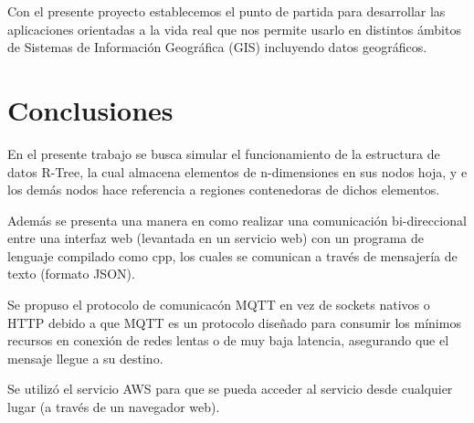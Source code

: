 \documentclass[a4paper]{article}
\begin{document}
Con el presente proyecto establecemos el punto de partida  para desarrollar las aplicaciones orientadas a la vida real que nos permite usarlo en distintos ámbitos de Sistemas de Información Geográfica (GIS) incluyendo datos geográficos.

\section{Conclusiones}

En el presente trabajo se busca simular el funcionamiento de la estructura de datos R-Tree, la cual almacena elementos de n-dimensiones en sus nodos hoja, y e los demás nodos hace referencia a regiones contenedoras de dichos elementos. 

Además se presenta una manera en como realizar una comunicación bi-direccional entre una interfaz web (levantada en un servicio web) con un programa de lenguaje compilado como cpp, los cuales se comunican a través de mensajería de texto (formato JSON).

Se propuso el protocolo de comunicacón MQTT en vez de sockets nativos o HTTP debido a que MQTT es un protocolo diseñado para consumir los mínimos recursos en conexión de redes lentas o de muy baja latencia, asegurando que el mensaje llegue a su destino.

Se utilizó el servicio AWS para que se pueda acceder al servicio desde cualquier lugar (a través de un navegador web).
\end{document}

